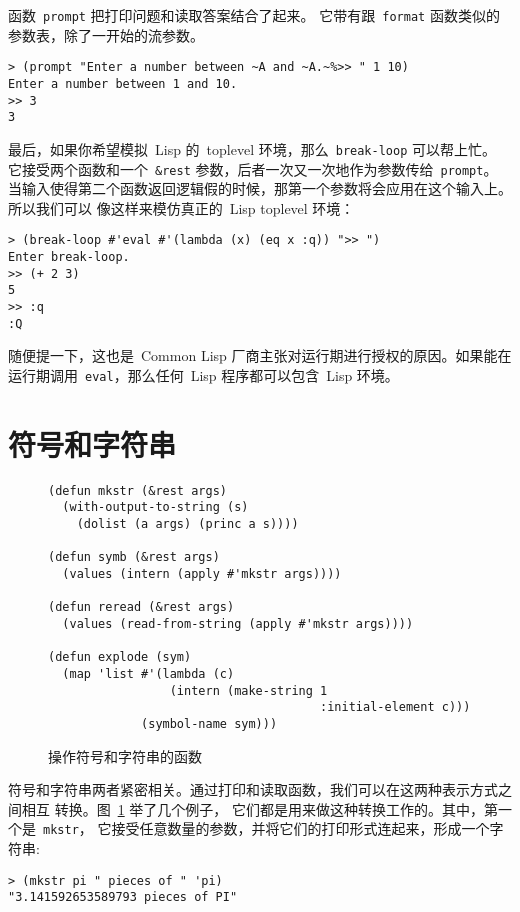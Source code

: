函数~\texttt{prompt} 把打印问题和读取答案结合了起来。
它带有跟~\texttt{format} 函数类似的参数表，除了一开始的流参数。
\begin{lstlisting}
> (prompt "Enter a number between ~A and ~A.~%>> " 1 10)
Enter a number between 1 and 10.
>> 3
3
\end{lstlisting}
最后，如果你希望模拟~Lisp 的~toplevel 环境，那么~\texttt{break-loop} 可以帮上忙。
它接受两个函数和一个~\verb|&rest| 参数，后者一次又一次地作为参数传给~\texttt{prompt}。
当输入使得第二个函数返回逻辑假的时候，那第一个参数将会应用在这个输入上。所以我们可以
像这样来模仿真正的~Lisp toplevel 环境：
\begin{lstlisting}
> (break-loop #'eval #'(lambda (x) (eq x :q)) ">> ")
Enter break-loop.
>> (+ 2 3)
5
>> :q
:Q
\end{lstlisting}

随便提一下，这也是~Common Lisp 厂商主张对运行期进行授权的原因。如果能在
运行期调用~\texttt{eval}，那么任何~Lisp 程序都可以包含~Lisp 环境。

\section{符号和字符串}
\label{sec:symbols_and_strings}

\begin{figure}
\begin{lstlisting}
(defun mkstr (&rest args)
  (with-output-to-string (s)
    (dolist (a args) (princ a s))))

(defun symb (&rest args)
  (values (intern (apply #'mkstr args))))

(defun reread (&rest args)
  (values (read-from-string (apply #'mkstr args))))

(defun explode (sym)
  (map 'list #'(lambda (c)
                 (intern (make-string 1
                                      :initial-element c)))
             (symbol-name sym)))
\end{lstlisting}
\caption{\label{fig:functions_which_operate_on_symbols_and_strings}
  操作符号和字符串的函数}
\end{figure}

符号和字符串两者紧密相关。通过打印和读取函数，我们可以在这两种表示方式之间相互
转换。图~\ref{fig:functions_which_operate_on_symbols_and_strings} 举了几个\utility{}例子，
它们都是用来做这种转换工作的。其中，第一个是~\texttt{mkstr}，
它接受任意数量的参数，并将它们的打印形式连起来，形成一个字符串:
\begin{lstlisting}
> (mkstr pi " pieces of " 'pi)
"3.141592653589793 pieces of PI"
\end{lstlisting}


